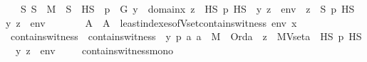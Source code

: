 \begin{isabellebody}
\ \ \ {\isachardoublequoteopen}{\isasymexists}S{\isachardot}{\kern0pt}\ S\ {\isasymin}\ M\ {\isasymand}\ S\ {\isasymsubseteq}\ HS\ {\isasymand}\ {\isacharparenleft}{\kern0pt}{\isasymforall}p\ {\isasymin}\ G{\isachardot}{\kern0pt}\ {\isasymforall}y\ {\isasymin}\ domain{\isacharparenleft}{\kern0pt}x{\isacharparenright}{\kern0pt}{\isachardot}{\kern0pt}\ {\isacharparenleft}{\kern0pt}{\isasymexists}z\ {\isasymin}\ HS{\isachardot}{\kern0pt}\ p\ {\isasymtturnstile}HS\ {\isasymphi}\ {\isacharparenleft}{\kern0pt}{\isacharbrackleft}{\kern0pt}y{\isacharcomma}{\kern0pt}\ z{\isacharbrackright}{\kern0pt}\ {\isacharat}{\kern0pt}\ env{\isacharparenright}{\kern0pt}{\isacharparenright}{\kern0pt}\ {\isasymlongleftrightarrow}\ {\isacharparenleft}{\kern0pt}{\isasymexists}z\ {\isasymin}\ S{\isachardot}{\kern0pt}\ p\ {\isasymtturnstile}HS\ {\isasymphi}\ {\isacharparenleft}{\kern0pt}{\isacharbrackleft}{\kern0pt}y{\isacharcomma}{\kern0pt}\ z{\isacharbrackright}{\kern0pt}\ {\isacharat}{\kern0pt}\ env{\isacharparenright}{\kern0pt}{\isacharparenright}{\kern0pt}{\isacharparenright}{\kern0pt}{\isachardoublequoteclose}\ \isanewline
%
\isadelimproof
%
\endisadelimproof
%
\isatagproof
{}\isamarkupfalse%
{\isacharminus}{\kern0pt}\ \ \isanewline
\ \ \isamarkupfalse%
\ A\ \ {\isachardoublequoteopen}A\ {\isasymequiv}\ least{\isacharunderscore}{\kern0pt}indexes{\isacharunderscore}{\kern0pt}of{\isacharunderscore}{\kern0pt}Vset{\isacharunderscore}{\kern0pt}contains{\isacharunderscore}{\kern0pt}witness{\isacharparenleft}{\kern0pt}{\isasymphi}{\isacharcomma}{\kern0pt}\ env{\isacharcomma}{\kern0pt}\ x{\isacharparenright}{\kern0pt}{\isachardoublequoteclose}\ \isanewline
\ \ \isamarkupfalse%
\ contains{\isacharunderscore}{\kern0pt}witness\ \ {\isachardoublequoteopen}contains{\isacharunderscore}{\kern0pt}witness\ {\isasymequiv}\ {\isasymlambda}y\ p\ a{\isachardot}{\kern0pt}\ a\ {\isasymin}\ M\ {\isasymand}\ Ord{\isacharparenleft}{\kern0pt}a{\isacharparenright}{\kern0pt}\ {\isasymand}\ {\isacharparenleft}{\kern0pt}{\isasymexists}z\ {\isasymin}\ MVset{\isacharparenleft}{\kern0pt}a{\isacharparenright}{\kern0pt}\ {\isasyminter}\ HS{\isachardot}{\kern0pt}\ p\ {\isasymtturnstile}HS\ {\isasymphi}\ {\isacharparenleft}{\kern0pt}{\isacharbrackleft}{\kern0pt}y{\isacharcomma}{\kern0pt}\ z{\isacharbrackright}{\kern0pt}\ {\isacharat}{\kern0pt}\ env{\isacharparenright}{\kern0pt}{\isacharparenright}{\kern0pt}{\isachardoublequoteclose}\ \isanewline
\isanewline
\ \ \isamarkupfalse%
\ contains{\isacharunderscore}{\kern0pt}witness{\isacharunderscore}{\kern0pt}mono\ {\isacharcolon}{\kern0pt}\ \isanewline

\end{isabellebody}
